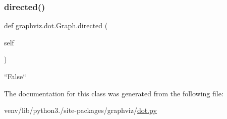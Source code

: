 \subsubsection{\texorpdfstring{directed()}{directed()}}
{\footnotesize\ttfamily def graphviz.\+dot.\+Graph.\+directed (\begin{DoxyParamCaption}\item[{}]{self }\end{DoxyParamCaption})}

\begin{DoxyVerb}``False``\end{DoxyVerb}
 

The documentation for this class was generated from the following file\+:\begin{DoxyCompactItemize}
\item 
venv/lib/python3./site-\/packages/graphviz/\hyperlink{dot_8py}{dot.\+py}\end{DoxyCompactItemize}
